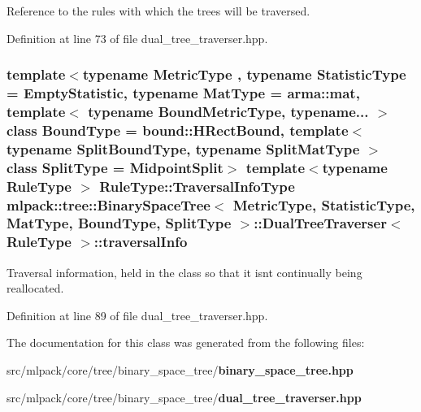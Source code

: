 Reference to the rules with which the trees will be traversed. 



Definition at line 73 of file dual\+\_\+tree\+\_\+traverser.\+hpp.

\subsubsection[{traversal\+Info}]{\setlength{\rightskip}{0pt plus 5cm}template$<$typename Metric\+Type , typename Statistic\+Type  = Empty\+Statistic, typename Mat\+Type  = arma\+::mat, template$<$ typename Bound\+Metric\+Type, typename... $>$ class Bound\+Type = bound\+::\+H\+Rect\+Bound, template$<$ typename Split\+Bound\+Type, typename Split\+Mat\+Type $>$ class Split\+Type = Midpoint\+Split$>$ template$<$typename Rule\+Type $>$ Rule\+Type\+::\+Traversal\+Info\+Type {\bf mlpack\+::tree\+::\+Binary\+Space\+Tree}$<$ Metric\+Type, Statistic\+Type, Mat\+Type, Bound\+Type, Split\+Type $>$\+::{\bf Dual\+Tree\+Traverser}$<$ Rule\+Type $>$\+::traversal\+Info\hspace{0.3cm}{\ttfamily [private]}}\label{classmlpack_1_1tree_1_1BinarySpaceTree_1_1DualTreeTraverser_a3ec9715887f31380acc6c0645f766e1a}


Traversal information, held in the class so that it isn\textquotesingle{}t continually being reallocated. 



Definition at line 89 of file dual\+\_\+tree\+\_\+traverser.\+hpp.



The documentation for this class was generated from the following files\+:\begin{DoxyCompactItemize}
\item 
src/mlpack/core/tree/binary\+\_\+space\+\_\+tree/{\bf binary\+\_\+space\+\_\+tree.\+hpp}\item 
src/mlpack/core/tree/binary\+\_\+space\+\_\+tree/{\bf dual\+\_\+tree\+\_\+traverser.\+hpp}\end{DoxyCompactItemize}
